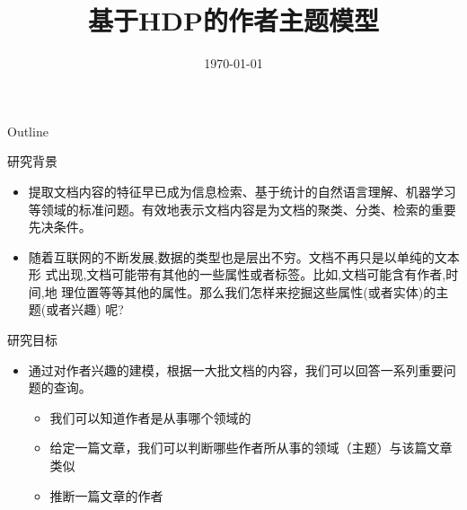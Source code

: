 \documentclass[presentation]{beamer}
\date{\today}
\title{基于HDP的作者主题模型}
\begin{document}
\maketitle
\begin{frame}{Outline}
\tableofcontents
\end{frame}

\begin{frame}[label={sec:orgheadline1}]{研究背景}
\begin{itemize}
\item 提取文档内容的特征早已成为信息检索、基于统计的自然语言理解、机器学习等领域的标准问题。有效地表示文档内容是为文档的聚类、分类、检索的重要先决条件。
\item 随着互联网的不断发展,数据的类型也是层出不穷。文档不再只是以单纯的文本形 式出现,文档可能带有其他的一些属性或者标签。比如,文档可能含有作者,时间,地 理位置等等其他的属性。那么我们怎样来挖掘这些属性(或者实体)的主题(或者兴趣) 呢?
\end{itemize}
\end{frame}
\begin{frame}[label={sec:orgheadline2}]{研究目标}
\begin{itemize}
\item 通过对作者兴趣的建模，根据一大批文档的内容，我们可以回答一系列重要问题的查询。
\begin{itemize}
\item 我们可以知道作者是从事哪个领域的
\item 给定一篇文章，我们可以判断哪些作者所从事的领域（主题）与该篇文章类似
\item 推断一篇文章的作者
\end{itemize}
\end{itemize}
\end{frame}
\end{document}
